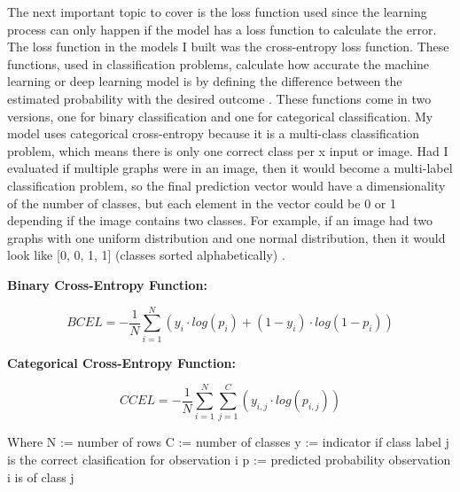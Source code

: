\documentclass[12pt]{article}
\begin{document}
                The next important topic to cover is the loss function used since the learning process can only happen 
                if the model has a loss function to calculate the error. 
                The loss function in the models I built was the cross-entropy loss function. 
                These functions, used in classification problems, calculate how accurate the machine learning 
                or deep learning model is by defining the difference between the estimated probability 
                with the desired outcome \cite{365team2023}. These functions come in two versions, 
                one for binary classification and one for categorical classification. 
                My model uses categorical cross-entropy because it is a multi-class classification problem, 
                which means there is only one correct class per x input or image. Had I evaluated if multiple graphs were in an image,
                then it would become a multi-label classification problem, so the final prediction vector would have
                a dimensionality of the number of classes, but each element in the vector could be 0 or 1 depending 
                if the image contains two classes. For example, if an image had two graphs with one uniform distribution 
                and one normal distribution, then it would look like [0, 0, 1, 1] (classes sorted alphabetically) \cite{gomez2018}.

                \textbf{Binary Cross-Entropy Function:}

                \begin{large}
                    
                    \[ BCEL = - \frac{1}{N} \sum_{i=1}^N (y_i \cdot log(p_i) + (1 - y_i) \cdot log(1-p_i)) \]

                \end{large}

                \textbf{Categorical Cross-Entropy Function:}
                
                \begin{large}
                    
                    \[ CCEL = - \frac{1}{N} \sum_{i=1}^N \sum_{j=1}^C (y_{i,j} \cdot log(p_{i,j})) \]

                \end{large}

                \noindent Where N := number of rows \newline
                C := number of classes \newline
                y := indicator if class label j is the correct clasification for observation i \newline
                p := predicted probability observation i is of class j
\end{document}

